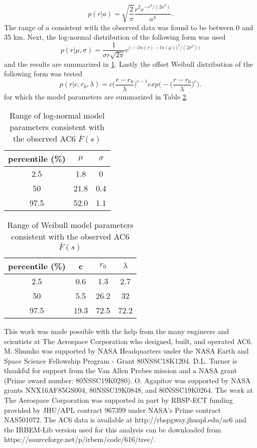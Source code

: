 \documentclass[draft]{agujournal2019}
\begin{document}
\begin{equation}
p(r | a) = \sqrt{\frac{2}{\pi}} \frac{r^2 e^{-r^2/(2a^2)}}{a^3}.
\end{equation} The range of $a$ consistent with the observed data was found to be between 0 and 35 km. Next, the log-normal distribution of the following form was used
\begin{equation}
p(r | \mu, \sigma) = \frac{1}{\sigma r \sqrt{2 \pi}} e^{\Big( -\big( ln(r) - ln(\mu) \big)^2/(2 \sigma^2) \Big)}
\end{equation} and the results are summarized in \ref{table_s1}. Lastly the offset Weibull distribution of the following form was tested
\begin{equation}
p(r | c, r_0, \lambda) = c \bigg(\frac{r-r_0}{\lambda}\bigg)^{c-1} exp \Bigg(- \bigg(\frac{r-r_0}{\lambda}\bigg)^{c} \Bigg).
\end{equation} for which the model parameters are summarized in Table \ref{table_s2}.

\begin{table}[h]
\caption{Range of log-normal model parameters consistent with the observed AC6  $\bar{F}(s)$}
\label{table_s1}
\centering
\begin{tabular}{|c|c|c|}
\hline 
percentile (\%) & $\mu$ & $\sigma$ \\ 
\hline 
2.5 & 1.8 & 0 \\ 
\hline 
50 & 21.8 & 0.4 \\ 
\hline 
97.5 & 52.0 & 1.1 \\ 
\hline 
\end{tabular} 
\end{table}

\begin{table}[h]
\caption{Range of Weibull model parameters consistent with the observed AC6  $\bar{F}(s)$}
\label{table_s2}
\centering
\begin{tabular}{|c|c|c|c|}
\hline 
percentile (\%) & c & $r_0$ & $\lambda$ \\ 
\hline 
2.5 & 0.6 & 1.3 & 2.7 \\ 
\hline 
50 & 5.5 & 26.2 & 32 \\ 
\hline 
97.5 & 19.3 & 72.5 & 72.2 \\ 
\hline 
\end{tabular} 
\end{table}

\acknowledgments
This work was made possible with the help from the many engineers and scientists at The Aerospace Corporation who designed, built, and operated AC6. M. Shumko was supported by NASA Headquarters under the NASA Earth and Space Science Fellowship Program - Grant 80NSSC18K1204. D.L. Turner is thankful for support from the Van Allen Probes mission and a NASA grant (Prime award number: 80NSSC19K0280). O. Agapitov was supported by NASA grants NNX16AF85GS004, 80NSSC19K0848, and 80NSSC19K0264. The work at The Aerospace Corporation was supported in part by RBSP-ECT funding provided by JHU/APL contract 967399 under NASA's Prime contract NAS501072. The AC6 data is available at http://rbspgway.jhuapl.edu/ac6 and the IRBEM-Lib version used for this analysis can be downloaded from https://sourceforge.net/p/irbem/code/616/tree/.
\end{document}
